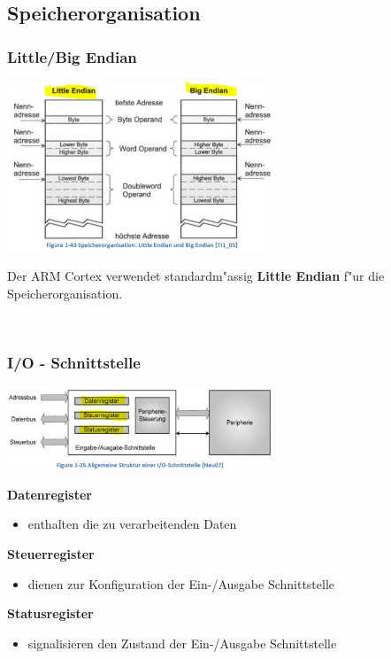 \subsection{Speicherorganisation}
\begin{minipage}{9cm}
	\subsubsection{Little/Big Endian}
    \includegraphics[width=8cm]{images/LittleBigEndian}
    
    Der ARM Cortex verwendet standardm"assig \textbf{Little Endian} f"ur die Speicherorganisation. 
\end{minipage}
%
\begin{minipage}{0.5cm}
	\-\
\end{minipage}
%
\begin{minipage}{9cm}
	 \subsubsection{I/O - Schnittstelle}
    \includegraphics[width=8cm]{images/IOSchnittstelle}
    
    \textbf{Datenregister}
    \begin{itemize}
    	\item enthalten die zu verarbeitenden Daten
    \end{itemize}
    \textbf{Steuerregister}
    \begin{itemize}
    	\item dienen zur Konfiguration der Ein-/Ausgabe Schnittstelle
    \end{itemize}
    \textbf{Statusregister}
    \begin{itemize}
    	\item signalisieren den Zustand der Ein-/Ausgabe Schnittstelle
    \end{itemize}
\end{minipage}
 
